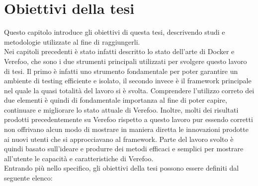 \chapter{Obiettivi della tesi} \label{ch:ThesisObj}

Questo capitolo introduce gli obiettivi di questa tesi, descrivendo studi e metodologie utilizzate al fine di raggiungerli.\\
Nei capitoli precedenti è stato infatti descritto lo stato dell'arte di Docker e Verefoo, che sono i due strumenti principali utilizzati per
svolgere questo lavoro di tesi. Il primo è infatti uno strumento fondamentale per poter garantire un ambiente di testing efficiente e isolato, il secondo
invece è il framework principale nel quale la quasi totalità del lavoro si è svolta. Comprendere l'utilizzo correto dei due elementi è quindi di fondamentale importanza al fine di 
poter capire, continuare e migliorare lo stato attuale di Verefoo. Inoltre, molti dei risultati prodotti precedentemente su Verefoo rispetto a questo lavoro pur essendo corretti non
offrivano alcun modo di mostrare in maniera diretta le innovazioni prodotte ai nuovi utenti che si approcciavano al framework. Parte del lavoro svolto è quindi basato sull'ideare e produrre
dei metodi efficaci e semplici per mostrare all'utente le capacità e caratteristiche di Verefoo.\\
Entrando più nello specifico, gli obiettivi della tesi possono essere definiti dal seguente elenco:


